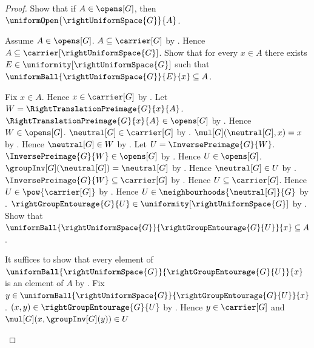 \begin{proof}
    Show that if $A\in\opens[G]$, then
        $\uniformOpen{\rightUniformSpace{G}}{A}$.
    \begin{subproof}
        Assume $A\in\opens[G]$.
        $A\subseteq\carrier[G]$ by .
        Hence $A\subseteq\carrier[\rightUniformSpace{G}]$.
        Show that for every $x\in A$ there exists
            $E\in\uniformity[\rightUniformSpace{G}]$ such that
            $\uniformBall{\rightUniformSpace{G}}{E}{x}\subseteq A$.
        \begin{subproof}
            Fix $x\in A$.
            Hence $x\in\carrier[G]$ by .
            Let $W=\RightTranslationPreimage{G}{x}{A}$.
            $\RightTranslationPreimage{G}{x}{A}\in\opens[G]$
                by .
            Hence $W\in\opens[G]$.
            $\neutral[G]\in\carrier[G]$ by .
            $\mul[G](\neutral[G],x)=x$ by .
            Hence $\neutral[G]\in W$
                by .
            Let $U=\InversePreimage{G}{W}$.
            $\InversePreimage{G}{W}\in\opens[G]$
                by .
            Hence $U\in\opens[G]$.
            $\groupInv[G](\neutral[G])=\neutral[G]$
                by .
            Hence $\neutral[G]\in U$ by .
            $\InversePreimage{G}{W}\subseteq\carrier[G]$
                by .
            Hence $U\subseteq\carrier[G]$.
            Hence $U\in\pow{\carrier[G]}$ by .
            Hence $U\in\neighbourhoods{\neutral[G]}{G}$
                by .
            $\rightGroupEntourage{G}{U}
                \in\uniformity[\rightUniformSpace{G}]$
                by .
            Show that $\uniformBall{\rightUniformSpace{G}}
                {\rightGroupEntourage{G}{U}}{x}\subseteq A$.
            \begin{subproof}
                It suffices to show that every element of
                    $\uniformBall{\rightUniformSpace{G}}
                        {\rightGroupEntourage{G}{U}}{x}$
                    is an element of $A$ by .
                Fix $y\in\uniformBall{\rightUniformSpace{G}}
                    {\rightGroupEntourage{G}{U}}{x}$.
                $(x,y)\in\rightGroupEntourage{G}{U}$
                    by .
                Hence $y\in\carrier[G]$ and
                    $\mul[G](x,\groupInv[G](y))\in U$

\end{subproof}
\end{subproof}
\end{subproof}
\end{proof}
